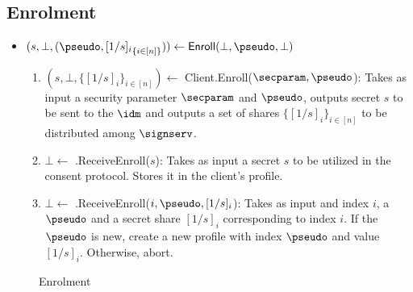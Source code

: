 

\subsection{Enrolment}
\begin{itemize}
    \item $(s, \bot, (\pseudo, {[1/s]_i}_{\{i \in [n]\}})) \gets \mathsf{Enroll}(\bot, \pseudo, \bot)$
    \begin{enumerate}
        \item $(s, \bot,\{[1/s]_i\}_{i\in [n]}) \gets$ \textsf{Client.Enroll}($\secparam, \pseudo$): Takes as input a security parameter $\secparam$ and $\pseudo$, outputs secret $s$ to be sent to the $\idm$ and outputs a set of shares $\{[1/s]_i\}_{i\in [n]}$ to be distributed among $\signserv$.
        \item $\bot \gets$ \textsf{\idm.ReceiveEnroll}($s$): Takes as input a secret  $s$ to be utilized in the consent protocol. Stores it in the client's profile.
        \item $\bot \gets$ \textsf{\signserv.ReceiveEnroll}($i, \pseudo, [1/s]_i$): Takes as input and index $i$, a $\pseudo$ and a secret share $[1/s]_i$ corresponding to index $i$. If the $\pseudo$ is new, create a new profile with index $\pseudo$ and value $[1/s]_i$. Otherwise, abort.
    \end{enumerate}
\end{itemize}

\begin{figure*}[h!]
\caption{Enrolment}
\label{prot:enrolment}
\end{figure*}


